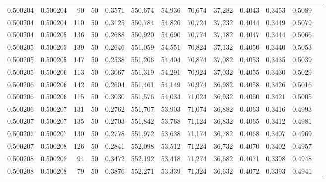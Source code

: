 \begin{tabular}{rrrrrrrrrrrrr}
0.500204 & 0.500204 &    90 &  50 &                                     0.3571 & 550,674 &  54,936 &  70,674 &  37,282 & 0.4043 & 0.3453 & 0.5089 \\
0.500204 & 0.500204 &   110 &  50 &                                     0.3125 & 550,784 &  54,826 &  70,724 &  37,232 & 0.4044 & 0.3449 & 0.5079 \\
0.500204 & 0.500205 &   136 &  50 &                                     0.2688 & 550,920 &  54,690 &  70,774 &  37,182 & 0.4047 & 0.3444 & 0.5066 \\
0.500205 & 0.500205 &   139 &  50 &                                     0.2646 & 551,059 &  54,551 &  70,824 &  37,132 & 0.4050 & 0.3440 & 0.5053 \\
0.500205 & 0.500205 &   147 &  50 &                                     0.2538 & 551,206 &  54,404 &  70,874 &  37,082 & 0.4053 & 0.3435 & 0.5039 \\
0.500205 & 0.500206 &   113 &  50 &                                     0.3067 & 551,319 &  54,291 &  70,924 &  37,032 & 0.4055 & 0.3430 & 0.5029 \\
0.500206 & 0.500206 &   142 &  50 &                                     0.2604 & 551,461 &  54,149 &  70,974 &  36,982 & 0.4058 & 0.3426 & 0.5016 \\
0.500206 & 0.500206 &   115 &  50 &                                     0.3030 & 551,576 &  54,034 &  71,024 &  36,932 & 0.4060 & 0.3421 & 0.5005 \\
0.500206 & 0.500207 &   131 &  50 &                                     0.2762 & 551,707 &  53,903 &  71,074 &  36,882 & 0.4063 & 0.3416 & 0.4993 \\
0.500207 & 0.500207 &   135 &  50 &                                     0.2703 & 551,842 &  53,768 &  71,124 &  36,832 & 0.4065 & 0.3412 & 0.4981 \\
0.500207 & 0.500207 &   130 &  50 &                                     0.2778 & 551,972 &  53,638 &  71,174 &  36,782 & 0.4068 & 0.3407 & 0.4969 \\
0.500207 & 0.500208 &   126 &  50 &                                     0.2841 & 552,098 &  53,512 &  71,224 &  36,732 & 0.4070 & 0.3402 & 0.4957 \\
0.500208 & 0.500208 &    94 &  50 &                                     0.3472 & 552,192 &  53,418 &  71,274 &  36,682 & 0.4071 & 0.3398 & 0.4948 \\
0.500208 & 0.500208 &    79 &  50 &                                     0.3876 & 552,271 &  53,339 &  71,324 &  36,632 & 0.4072 & 0.3393 & 0.4941 \\

\end{tabular}

